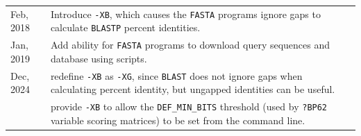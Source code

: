 \begin{longtable}{p{0.75 in}p{5.25 in}}
Feb, 2018 & Introduce \texttt{-XB}, which causes the \texttt{FASTA}
programs ignore gaps to calculate \texttt{BLASTP} percent
identities.\\[1.0ex]

Jan, 2019 & Add ability for \texttt{FASTA} programs to download query sequences and database using scripts.\\[1.0ex]

Dec, 2024 & redefine \texttt{-XB} as \texttt{-XG}, since
\texttt{BLAST} does not ignore gaps when calculating percent identity, but ungapped identities can be useful.\\[1.0ex]

 & provide \texttt{-XB} to allow the \texttt{DEF\_MIN\_BITS} threshold
(used by \texttt{?BP62} variable scoring matrices) to be set from the
command line.\\[1.0ex]

\hline
\end{longtable}
